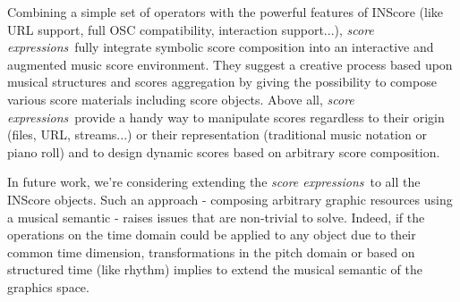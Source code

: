 \documentclass{article}
\newenvironment{ExprCode}		{\vspace{-2mm} \small\verbatim}{\endverbatim\vspace{-2mm}}
\newcommand{\sExpr}{\emph{score expressions}}
\begin{document}
Combining a simple set of operators with the powerful features of INScore (like URL support, full OSC compatibility, interaction support...), \sExpr\ fully integrate symbolic score composition into an interactive and augmented music score environment. They suggest a creative process based upon musical structures and scores aggregation by giving the possibility to compose various score materials including score objects. Above all, \sExpr\ provide a handy way to manipulate scores regardless to their origin (files, URL, streams...) or their representation (traditional music notation or piano roll) and to design dynamic scores based on arbitrary score composition.

In future work, we're considering extending the \sExpr\ to all the INScore objects. Such an approach - composing arbitrary graphic resources using a musical semantic - raises issues that are non-trivial to solve. Indeed, if the operations on the time domain could be applied to any object due to their common time dimension, transformations in the pitch domain or based on structured time (like rhythm) implies to extend the musical semantic of the graphics space.




\balance


%               
%      
\end{document}
